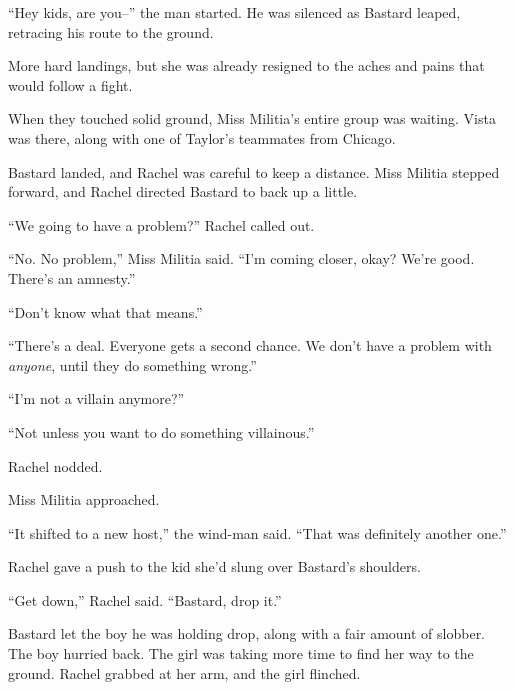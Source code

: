 ``Hey kids, are you--'' the man started.  He was silenced as Bastard leaped, retracing his route to the ground.



More hard landings, but she was already resigned to the aches and pains that would follow a fight.



When they touched solid ground, Miss Militia's entire group was waiting.  Vista was there, along with one of Taylor's teammates from Chicago.



Bastard landed, and Rachel was careful to keep a distance.  Miss Militia stepped forward, and Rachel directed Bastard to back up a little.



``We going to have a problem?'' Rachel called out.



``No.  No problem,'' Miss Militia said.  ``I'm coming closer, okay?  We're good.  There's an amnesty.''



``Don't know what that means.''



``There's a deal.  Everyone gets a second chance.  We don't have a problem with \emph{anyone}, until they do something wrong.''



``I'm not a villain anymore?''



``Not unless you want to do something villainous.''



Rachel nodded.



Miss Militia approached.



``It shifted to a new host,'' the wind-man said.  ``That was definitely another one.''



Rachel gave a push to the kid she'd slung over Bastard's shoulders.



``Get down,'' Rachel said.  ``Bastard, drop it.''



Bastard let the boy he was holding drop, along with a fair amount of slobber.  The boy hurried back.  The girl was taking more time to find her way to the ground.  Rachel grabbed at her arm, and the girl flinched.



